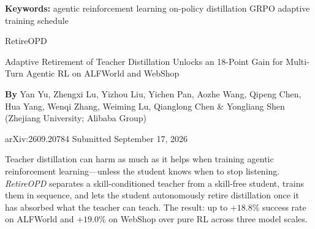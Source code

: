 \documentclass[10pt,twocolumn]{article}
\begin{document}
\setlength{\parindent}{0pt}
\setlength{\parskip}{4pt}

{\small\color{keywordgray}\textbf{Keywords:}
  agentic reinforcement learning \textbullet{}
  on-policy distillation \textbullet{}
  GRPO \textbullet{}
  adaptive training schedule}\par\vspace{4pt}

{\LARGE\bfseries\raggedright
  RetireOPD}\par\vspace{4pt}

{\large\itshape\raggedright
  Adaptive Retirement of Teacher Distillation Unlocks an 18-Point Gain for
  Multi-Turn Agentic RL on ALFWorld and WebShop}\par\vspace{6pt}

{\small\textbf{By} Yan Yu, Zhengxi Lu, Yizhou Liu, Yichen Pan, Aozhe Wang,
  Qipeng Chen, Hua Yang, Wenqi Zhang, Weiming Lu, Qianglong Chen
  \& Yongliang Shen (Zhejiang University; Alibaba Group)}\par\vspace{2pt}

{\small\color{keywordgray}arXiv:2609.20784 \textbullet{} Submitted September 17, 2026}
\par\vspace{2pt}\noindent{\color{rulered}\rule{\columnwidth}{0.6pt}}\vspace{6pt}

Teacher distillation can harm as much as it helps when training agentic
reinforcement learning---unless the student knows when to stop listening.
\textit{RetireOPD} separates a skill-conditioned teacher from a skill-free
student, trains them in sequence, and lets the student autonomously retire
distillation once it has absorbed what the teacher can teach.
The result: up to $+18.8\%$ success rate on ALFWorld and $+19.0\%$ on
WebShop over pure RL across three model scales.
\end{document}
